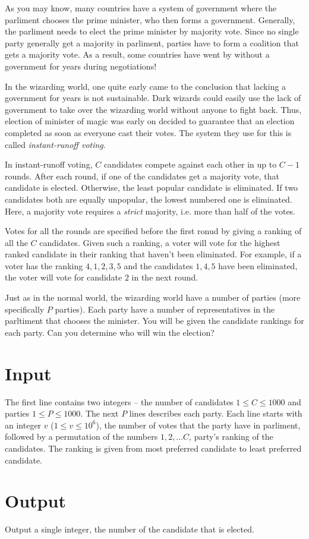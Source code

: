As you may know, many countries have a system of government where the parliment chooses the prime minister, who then forms a government.
Generally, the parliment needs to elect the prime minister by majority vote.
Since no single party generally get a majority in parliment, parties have to form a coalition that gets a majority vote.
As a result, some countries have went by without a government for years during negotiations!

In the wizarding world, one quite early came to the conclusion that lacking a government for years is not sustainable.
Dark wizards could easily use the lack of government to take over the wizarding world without anyone to fight back.
Thus, election of minister of magic was early on decided to guarantee that an election completed as soon as everyone cast their votes.
The system they use for this is called \emph{instant-runoff voting}.

In instant-runoff voting, $C$ candidates compete against each other in up to $C - 1$ rounds.
After each round, if one of the candidates get a majority vote, that candidate is elected.
Otherwise, the least popular candidate is eliminated.
If two candidates both are equally unpopular, the lowest numbered one is eliminated.
Here, a majority vote requires a \emph{strict} majority, i.e. more than half of the votes.

Votes for all the rounds are specified before the first ronud by giving a ranking of all the $C$ candidates.
Given such a ranking, a voter will vote for the highest ranked candidate in their ranking that haven't been eliminated.
For example, if a voter has the ranking $4, 1, 2, 3, 5$ and the candidates $1, 4, 5$ have been eliminated, the voter will vote for candidate $2$ in the next round.

Just as in the normal world, the wizarding world have a number of parties (more specifically $P$ parties).
Each party have a number of representatives in the parltiment that chooses the minister.
You will be given the candidate rankings for each party.
Can you determine who will win the election?

\section*{Input}
The first line contains two integers -- the number of candidates $1 \le C \le 1000$ and parties $1 \le P \le 1000$.
The next $P$ lines describes each party.
Each line starts with an integer $v$ ($1 \le v \le 10^6$), the number of votes that the party have in parliment, followed by a permutation of the numbers $1, 2, \dots C$, party's ranking of the candidates.
The ranking is given from most preferred candidate to least preferred candidate.

\section*{Output}
Output a single integer, the number of the candidate that is elected.
